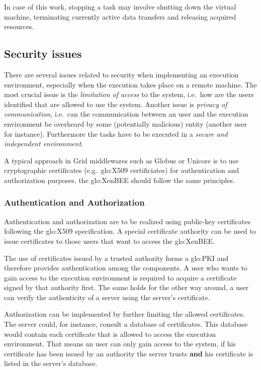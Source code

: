 In  case of  this work,  stopping  a task  may involve  shutting down  the
virtual machine, terminating currently active data transfers and releasing
acquired resources.

\subsection{Security issues}

There  are  several  issues  related  to  security  when  implementing  an
execution  environment, especially  when the  execution takes  place  on a
remote machine. The most crucial  issue is the \emph{limitation of access}
to the system,  i.e.~how are the users identified that  are allowed to use
the system.   Another issue  is \emph{privacy of  communication}, i.e.~can
the  communication  between  an  user  and the  execution  environment  be
overheard  by  some  (potentially  malicious)  entity  (another  user  for
instance).  Furthermore  the tasks have  to be executed in  a \emph{secure
  and independent environment}.

A typical  approach in  Grid middlewares such  as Globus  \cite{globus} or
Unicore    \cite{unicore}   is    to   use    cryptographic   certificates
(e.g.~\gls{glo:X509}  certificiates) for authentication  and authorization
purposes, the \gls{glo:XenBEE} should follow the same principles.

\subsubsection{Authentication and Authorization}

Authentication  and  authorization are  to  be  realized using  public-key
certificates  following  the   \gls{glo:X509}  specification.   A  special
certificate authority  can be  used to issue  certificates to  those users
that want to access the \gls{glo:XenBEE}.

The  use   of  certificates  issued   by  a  trusted  authority   forms  a
\gls{glo:PKI}   and   therefore    provides   authentication   among   the
components. A user  who wants to gain access  to the execution environment
is required to  acquire a certificate signed by  that authority first. The
same holds for the other way around, a user can verify the authenticity of
a server using the server's certificate.

Authorization  can   be  implemented  by  further   limiting  the  allowed
certificates.   The server  could,  for instance,  consult  a database  of
certificates. This database would contain each certificate that is allowed
to  access the execution  environment. That  means an  user can  only gain
access to the  system, if his certificate has been  issued by an authority
the server trusts  \textbf{and} his certificate is listed  in the server's
database.

